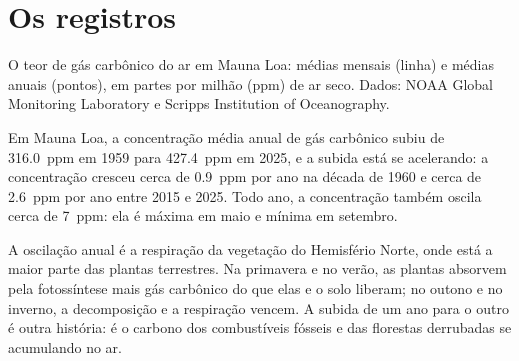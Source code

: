 \section{Os registros}

\begin{omfigure}

{\small O teor de gás carbônico do ar em Mauna Loa: médias mensais (linha) e
médias anuais (pontos), em partes por milhão (ppm) de ar seco. Dados: NOAA
Global Monitoring Laboratory e Scripps Institution of Oceanography.}
\end{omfigure}

\begin{proposition}\label{prop:g12:climate-change:co2}
Em Mauna Loa, a concentração média anual de gás carbônico subiu de
\qty{316.0}{ppm} em 1959 para \qty{427.4}{ppm} em 2025, e a subida está se
acelerando: a concentração cresceu cerca de \qty{0.9}{ppm} por ano na década
de 1960 e cerca de \qty{2.6}{ppm} por ano entre 2015 e 2025. Todo ano, a
concentração também oscila cerca de \qty{7}{ppm}: ela é máxima em maio e
mínima em setembro.
\end{proposition}

\begin{remark}\label{rem:g12:climate-change:teeth}
A oscilação anual é a respiração da vegetação do Hemisfério Norte, onde está
a maior parte das plantas terrestres. Na primavera e no verão, as plantas
absorvem pela fotossíntese mais gás carbônico do que elas e o solo liberam;
no outono e no inverno, a decomposição e a respiração vencem. A subida de um
ano para o outro é outra história: é o carbono dos combustíveis fósseis e
das florestas derrubadas se acumulando no ar.
\end{remark}

